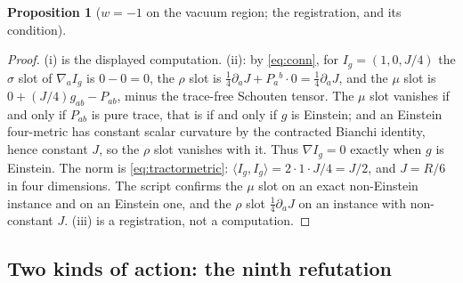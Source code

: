 \documentclass[11pt]{article}
\newtheorem{proposition}[theorem]{Proposition}
\theoremstyle{definition}
\newcommand{\ip}[2]{\langle #1, #2\rangle}
\begin{document}
\begin{proposition}[$w = -1$ on the vacuum region; the registration, and its condition]
\begin{enumerate}
\end{enumerate}
\end{proposition}

\begin{proof}
(i) is the displayed computation. (ii): by \eqref{eq:conn}, for $I_g = (1, 0, J/4)$ the $\sigma$ slot of $\nabla_a I_g$ is $0 - 0 = 0$, the $\rho$ slot is $\tfrac14\partial_a J + P_a{}^b\cdot 0 = \tfrac14\partial_a J$, and the $\mu$ slot is $0 + (J/4)g_{ab} - P_{ab}$, minus the trace-free Schouten tensor. The $\mu$ slot vanishes if and only if $P_{ab}$ is pure trace, that is if and only if $g$ is Einstein; and an Einstein four-metric has constant scalar curvature by the contracted Bianchi identity, hence constant $J$, so the $\rho$ slot vanishes with it. Thus $\nabla I_g = 0$ exactly when $g$ is Einstein. The norm is \eqref{eq:tractormetric}: $\ip{I_g}{I_g} = 2\cdot 1\cdot J/4 = J/2$, and $J = R/6$ in four dimensions. The script confirms the $\mu$ slot on an exact non-Einstein instance and on an Einstein one, and the $\rho$ slot $\tfrac14\partial_a J$ on an instance with non-constant $J$. (iii) is a registration, not a computation.
\end{proof}

\subsection{Two kinds of action: the ninth refutation}\label{subsec:twokinds}
\end{document}
